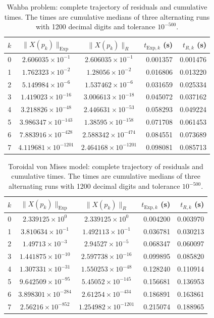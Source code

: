 \documentclass[11pt]{article}
\newcommand{\Exp}{\mathrm{Exp}}
\begin{document}
\begin{table}[H]
\centering
\scriptsize
\setlength{\tabcolsep}{4.2pt}
\begin{tabular}{rccrr}
\toprule
$k$ & $\|X(p_k)\|_{\Exp}$ & $\|X(p_k)\|_R$
& $t_{\Exp,k}$ (s) & $t_{R,k}$ (s)\\
\midrule
0 & $2.606035\times10^{-1}$ & $2.606035\times10^{-1}$ & 0.001357 & 0.001476 \\
1 & $1.762323\times10^{-2}$ & $1.28056\times10^{-2}$ & 0.016806 & 0.013220 \\
2 & $5.149984\times10^{-6}$ & $1.537462\times10^{-6}$ & 0.031659 & 0.025334 \\
3 & $1.419023\times10^{-16}$ & $3.006613\times10^{-18}$ & 0.045072 & 0.037162 \\
4 & $3.218826\times10^{-48}$ & $2.446631\times10^{-53}$ & 0.058293 & 0.049224 \\
5 & $3.986347\times10^{-143}$ & $1.38595\times10^{-158}$ & 0.071708 & 0.061453 \\
6 & $7.883916\times10^{-428}$ & $2.588342\times10^{-474}$ & 0.084551 & 0.073689 \\
7 & $4.119681\times10^{-1201}$ & $2.464168\times10^{-1201}$ & 0.098081 & 0.085713 \\
\bottomrule
\end{tabular}
\caption{Wahba problem: complete trajectory of residuals and cumulative times. The times are cumulative medians of three alternating runs with 1200 decimal digits and tolerance $10^{-500}$.}
\label{tab:supp_wahba}
\end{table}

\begin{table}[H]
\centering
\scriptsize
\setlength{\tabcolsep}{4.2pt}
\begin{tabular}{rccrr}
\toprule
$k$ & $\|X(p_k)\|_{\Exp}$ & $\|X(p_k)\|_R$
& $t_{\Exp,k}$ (s) & $t_{R,k}$ (s)\\
\midrule
0 & $2.339125\times10^{0}$ & $2.339125\times10^{0}$ & 0.004200 & 0.003970 \\
1 & $3.810634\times10^{-1}$ & $1.492113\times10^{-1}$ & 0.036781 & 0.030213 \\
2 & $1.49713\times10^{-3}$ & $2.94527\times10^{-5}$ & 0.068347 & 0.060097 \\
3 & $1.441875\times10^{-10}$ & $2.597738\times10^{-16}$ & 0.099895 & 0.085820 \\
4 & $1.307331\times10^{-31}$ & $1.550253\times10^{-48}$ & 0.128240 & 0.110914 \\
5 & $9.642509\times10^{-95}$ & $5.45052\times10^{-145}$ & 0.156681 & 0.136953 \\
6 & $3.898301\times10^{-284}$ & $2.61254\times10^{-434}$ & 0.186891 & 0.163861 \\
7 & $2.56216\times10^{-852}$ & $1.254982\times10^{-1201}$ & 0.215074 & 0.188965 \\
\bottomrule
\end{tabular}
\caption{Toroidal von Mises model: complete trajectory of residuals and cumulative times. The times are cumulative medians of three alternating runs with 1200 decimal digits and tolerance $10^{-500}$.}
\label{tab:supp_von_mises}
\end{table}
\end{document}
